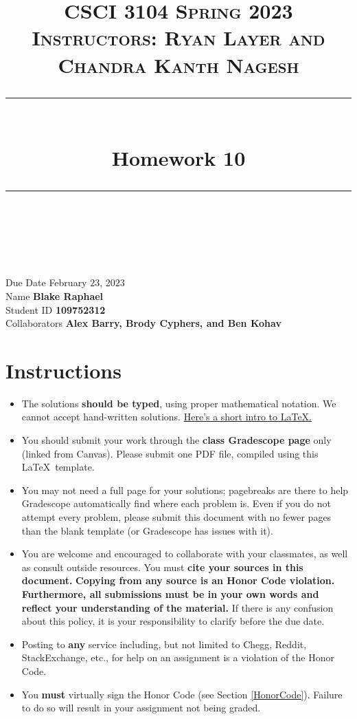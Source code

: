 \documentclass[11pt]{article}
\title{
\normalfont \normalsize 
\textsc{CSCI 3104 Spring 2023 \\ 
Instructors: Ryan Layer and Chandra Kanth Nagesh} \\
[10pt] 
\rule{\linewidth}{0.5pt} \\[6pt] 
\huge Homework 10 \\
\rule{\linewidth}{2pt}  \\[10pt]
}
\author{}
\date{}
\theoremstyle{definition}
\theoremstyle{definition}
\theoremstyle{definition}
\begin{document}

\maketitle


\noindent
Due Date \dotfill February 23, 2023 \\
Name \dotfill \textbf{Blake Raphael} \\
Student ID \dotfill \textbf{109752312} \\
Collaborators \dotfill \textbf{Alex Barry, Brody Cyphers, and Ben Kohav}

\tableofcontents

\section{Instructions}
 \begin{itemize}
	\item The solutions \textbf{should be typed}, using proper mathematical notation. We cannot accept hand-written solutions. \href{http://ece.uprm.edu/~caceros/latex/introduction.pdf}{Here's a short intro to \LaTeX.}
	\item You should submit your work through the \textbf{class Gradescope page} only (linked from Canvas). Please submit one PDF file, compiled using this \LaTeX \ template.
	\item You may not need a full page for your solutions; pagebreaks are there to help Gradescope automatically find where each problem is. Even if you do not attempt every problem, please submit this document with no fewer pages than the blank template (or Gradescope has issues with it).

	\item You are welcome and encouraged to collaborate with your classmates, as well as consult outside resources. You must \textbf{cite your sources in this document.} \textbf{Copying from any source is an Honor Code violation. Furthermore, all submissions must be in your own words and reflect your understanding of the material.} If there is any confusion about this policy, it is your responsibility to clarify before the due date. 

	\item Posting to \textbf{any} service including, but not limited to Chegg, Reddit, StackExchange, etc., for help on an assignment is a violation of the Honor Code.

	\item You \textbf{must} virtually sign the Honor Code (see Section \ref{HonorCode}). Failure to do so will result in your assignment not being graded.
\end{itemize}
\end{document}
